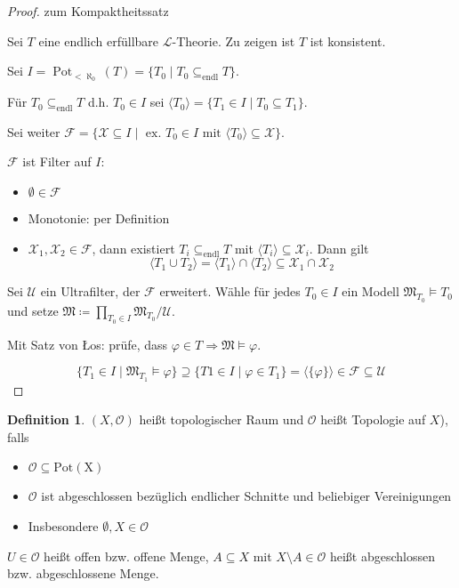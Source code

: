 \documentclass[12pt,parskip=full]{scrartcl}
\theoremstyle{definition}
\newtheorem{definition}[theorem]{Definition}
\begin{document}
	\begin{proof} zum Kompaktheitssatz
		
		Sei $T$ eine endlich erfüllbare $\mathcal{L}$-Theorie. Zu zeigen ist $T$ ist konsistent.
		
		Sei $I = \operatorname{Pot}_{<\aleph_0}(T) = \{ T_0 \mid T_0 \subseteq_\text{endl} T \}$.
		
		Für $T_0 \subseteq_\text{endl} T$ d.h. $T_0 \in I$ sei $\langle T_0 \rangle = \{ T_1 \in I \mid T_0 \subseteq T_1 \}$.
		
		Sei weiter $\mathcal{F} = \{ \mathcal{X} \subseteq I \mid \text{ ex. $T_0 \in I$ mit } \langle T_0 \rangle \subseteq \mathcal{X} \}$.
		
		$\mathcal{F}$ ist Filter auf $I$:
		\begin{itemize}
			\item $\emptyset \in \mathcal{F}$
			\item Monotonie: per Definition
			\item $\mathcal{X}_1, \mathcal{X}_2 \in \mathcal{F}$, dann existiert $T_i \subseteq_\text{endl} T$ mit $\langle T_i \rangle \subseteq \mathcal{X}_i$. Dann gilt
			\begin{equation*}
				\langle T_1 \cup T_2 \rangle = \langle T_1 \rangle \cap \langle T_2 \rangle \subseteq \mathcal{X}_1 \cap \mathcal{X}_2
			\end{equation*}
		\end{itemize}
	
		Sei $\mathcal{U}$ ein Ultrafilter, der $\mathcal{F}$ erweitert. Wähle für jedes $T_0 \in I$ ein Modell $\mathfrak{M}_{T_0} \models T_0$ und setze $\mathfrak{M} \coloneq \prod_{T_0 \in I} \mathfrak{M}_{T_0} / \mathcal{U}$.
		
		Mit Satz von \L os: prüfe, dass $\varphi \in T \Rightarrow \mathfrak{M} \models \varphi$.
		
		\begin{equation*}
			\{ T_1 \in I \mid \mathfrak{M}_{T_1} \models \varphi \} \supseteq \{ T1 \in I \mid \varphi \in T_1 \} = \langle \{ \varphi \} \rangle \in \mathcal{F} \subseteq \mathcal{U}
		\end{equation*}
	\end{proof}

	\begin{definition}
		$(X, \mathcal{O})$ heißt topologischer Raum und $\mathcal{O}$ heißt Topologie auf $X$), falls
		\begin{itemize}
			\item $\mathcal{O} \subseteq \operatorname{Pot(X)}$
			\item $\mathcal{O}$ ist abgeschlossen bezüglich endlicher Schnitte und beliebiger Vereinigungen
			\item Insbesondere $\emptyset, X \in \mathcal{O}$
		\end{itemize}
	
		$U \in \mathcal{O}$ heißt offen bzw. offene Menge, $A \subseteq X$ mit $X \setminus A \in \mathcal{O}$ heißt abgeschlossen bzw. abgeschlossene Menge.
	\end{definition}
\end{document}
